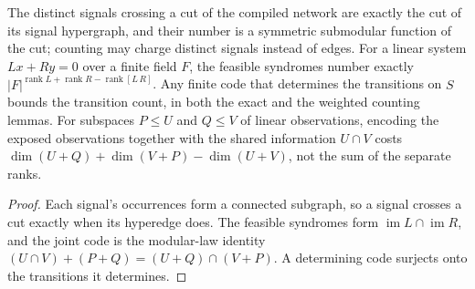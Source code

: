 \begin{theorem}
  \label{thm:lowerbounds-frontier-boundary}
  \leanok
  The distinct signals crossing a cut of the compiled network are exactly the
  cut of its signal hypergraph, and their number is a symmetric submodular
  function of the cut; counting may charge distinct signals instead of edges.
  For a linear system $Lx+Ry=0$ over a finite field $F$, the feasible syndromes
  number exactly $|F|^{\operatorname{rank}L+\operatorname{rank}R-\operatorname{rank}[L\,R]}$.
  Any finite code that determines the transitions on $S$ bounds the transition
  count, in both the exact and the weighted counting lemmas. For subspaces
  $P\le U$ and $Q\le V$ of linear observations, encoding the exposed observations
  together with the shared information $U\cap V$ costs
  $\dim(U+Q)+\dim(V+P)-\dim(U+V)$, not the sum of the separate ranks.
\end{theorem}
\begin{proof}
  \leanok
  Each signal's occurrences form a connected subgraph, so a signal crosses a cut
  exactly when its hyperedge does. The feasible syndromes form
  $\operatorname{im}L\cap\operatorname{im}R$, and the joint code is the
  modular-law identity $(U\cap V)+(P+Q)=(U+Q)\cap(V+P)$. A determining code surjects onto the
  transitions it determines.
\end{proof}

